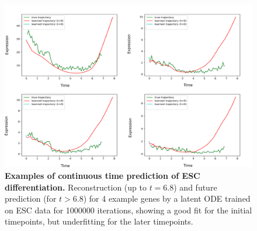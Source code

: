 \begin{center}
\begin{figure}[H]
  \includegraphics[width=\linewidth]{./figures/latent_ode_val_underfit.png}
    \caption[Examples of continuous time prediction of ESC differentiation.]{\textbf{Examples of continuous time prediction of ESC differentiation.} Reconstruction (up to $t=6.8$) and future prediction (for $t>6.8$) for 4 example genes by a  latent ODE \citep{chen2018neural} trained on ESC data \citep{Klein2015} for 1000000 iterations, showing a good fit for the initial timepoints, but underfitting for the later timepoints.}
  \label{fig:figS9}
\end{figure}
\end{center}

